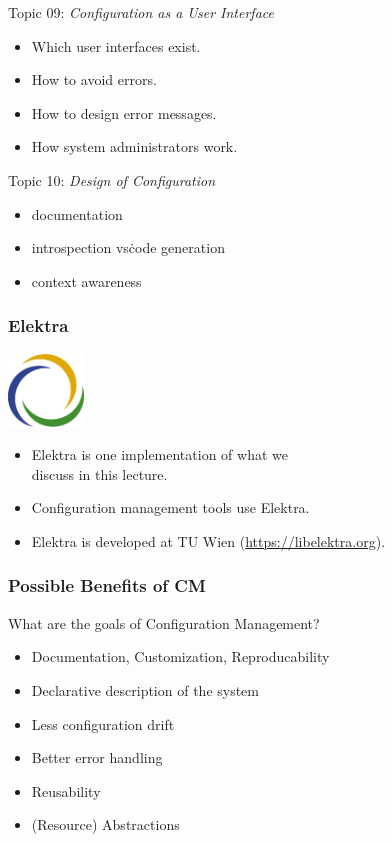\begin{frame}
	Topic 09: \textit{Configuration as a User Interface}
	\begin{itemize}
		\item Which user interfaces exist.
		\item How to avoid errors.
		\item How to design error messages.
		\item How system administrators work.
	\end{itemize}
\end{frame}

\begin{frame}
	Topic 10: \textit{Design of Configuration}
	\begin{itemize}
		\item documentation
		\item introspection vs\. code generation
		\item context awareness
	\end{itemize}
\end{frame}


\begin{frame}
	\frametitle{Elektra}
	\hfill \includegraphics[width=2cm]{../figures/logo}
	\vspace{-1cm}
	\begin{itemize}
		\item Elektra is one implementation of what we \\ discuss in this lecture.
		\item Configuration management tools use Elektra.
		\item Elektra is developed at TU Wien (\url{https://libelektra.org}).
	\end{itemize}
\end{frame}

\begin{frame}
	\frametitle{Possible Benefits of CM}

	\begin{task}
	What are the goals of Configuration Management?
	\end{task}

	\pause

	\begin{itemize} %
	\item Documentation, Customization, Reproducability
	\item Declarative description of the system
	\item Less configuration drift
	\item Better error handling
	\item Reusability
	\item (Resource) Abstractions
	\end{itemize}
\end{frame}


